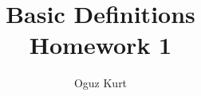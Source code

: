 \documentclass{ximera}
\title{Basic Definitions \\ Homework 1}
\author{Oguz Kurt}
\begin{document}
\maketitle
 
\begin{problem}
\end{problem}
\end{document}
